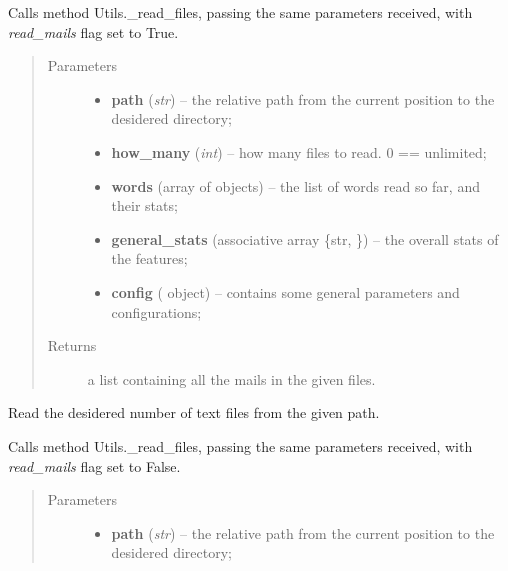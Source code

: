 \documentclass[letterpaper,10pt,english]{sphinxmanual}
\begin{document}
\begin{fulllineitems}
\begin{fulllineitems}
Calls method Utils.\_read\_files, passing the same parameters received,
with \emph{read\_mails} flag set to True.
\begin{quote}\begin{description}
\item[{Parameters}] \leavevmode\begin{itemize}
\item {} 
\textbf{path} (\emph{str}) -- the relative path from the current position to the                 desidered directory;

\item {} 
\textbf{how\_many} (\emph{int}) -- how many files to read. 0 == unlimited;

\item {} 
\textbf{words} (array of {\hyperref[index:gen_stat.Word]{}} objects) -- the list of words read so far, and their stats;

\item {} 
\textbf{general\_stats} (associative array \{str, {\hyperref[index:gen_stat.Stat]{}}\}) -- the overall stats of the features;

\item {} 
\textbf{config} ({\hyperref[index:config.Config]{}} object) -- contains some general parameters and configurations;

\end{itemize}

\item[{Returns}] \leavevmode
a list containing all the mails in the given files.

\end{description}\end{quote}

\end{fulllineitems}


\begin{fulllineitems}
\label{index:utils.Utils.read_text}
Read the desidered number of text files from the given path.

Calls method Utils.\_read\_files, passing the same parameters received,
with \emph{read\_mails} flag set to False.
\begin{quote}\begin{description}
\item[{Parameters}] \leavevmode\begin{itemize}
\item {} 
\textbf{path} (\emph{str}) -- the relative path from the current position                 to the desidered directory;


\end{itemize}
\end{description}
\end{quote}
\end{fulllineitems}
\end{fulllineitems}
\end{document}
